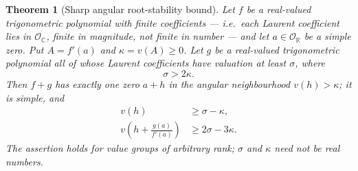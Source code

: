\documentclass[11pt,letterpaper]{article}
\numberwithin{equation}{section}
\newtheorem{theorem}{Theorem}[section]
\theoremstyle{definition}
\theoremstyle{remark}
\newcommand{\R}{\mathbb R}
\newcommand{\C}{\mathbb C}
\newcommand{\OO}{\mathcal O}
\begin{document}
\begin{theorem}[Sharp angular root-stability bound]\label{trigonometry:thm:stability}
Let $f$ be a real-valued trigonometric polynomial with \emph{finite coefficients} --- i.e.\ each
Laurent coefficient lies in $\OO_{\C}$, finite in magnitude, \emph{not} finite in number --- and
let $a\in\OO_{\R}$ be a simple zero. Put $A=f'(a)$ and $\kappa=v(A)\ge0$. Let $g$ be a real-valued
trigonometric polynomial all of whose Laurent coefficients have valuation at least $\sigma$, where
\begin{equation}\label{trigonometry:eq:stabilitythreshold}
 \sigma>2\kappa .
\end{equation}
Then $f+g$ has exactly one zero $a+h$ in the angular neighbourhood $v(h)>\kappa$; it is simple, and
\begin{align}
 v(h)&\ge\sigma-\kappa,\label{trigonometry:eq:stabilityfirst}\\
 v\left(h+\frac{g(a)}{f'(a)}\right)&\ge2\sigma-3\kappa.\label{trigonometry:eq:stabilitysecond}
\end{align}
The assertion holds for value groups of arbitrary rank; $\sigma$ and $\kappa$ need not be real
numbers.
\end{theorem}
\end{document}

